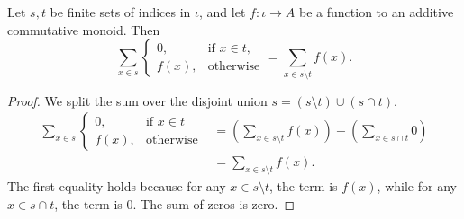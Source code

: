 \begin{lemma}\label{lem:sum_ite_not_mem}
    \leanok
    Let $s, t$ be finite sets of indices in $\iota$, and let $f \colon \iota \to A$ be a function to an additive commutative monoid. Then
    \[
    \sum_{x \in s} 
    \begin{cases}
    0, & \text{if } x \in t, \\
    f(x), & \text{otherwise}
    \end{cases}
    =
    \sum_{x \in s \setminus t} f(x).
    \]
\end{lemma}
\begin{proof}
    \leanok
    We split the sum over the disjoint union $s = (s \setminus t) \cup (s \cap t)$.
    \begin{align*}
    \sum_{x \in s} 
    \begin{cases}
    0, & \text{if } x \in t \\
    f(x), & \text{otherwise}
    \end{cases}
    &=
    \left( \sum_{x \in s \setminus t} f(x) \right)
    +
    \left( \sum_{x \in s \cap t} 0 \right) \\
    &= \sum_{x \in s \setminus t} f(x).
    \end{align*}
    The first equality holds because for any $x \in s \setminus t$, the term is $f(x)$, while for any $x \in s \cap t$, the term is $0$. 
    The sum of zeros is zero.
\end{proof}